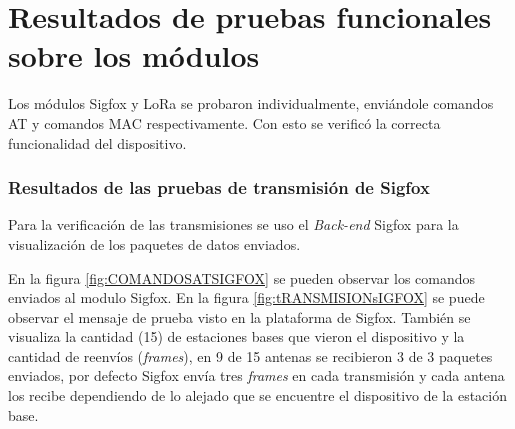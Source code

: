 \section{Resultados de pruebas funcionales sobre  los módulos}

Los módulos Sigfox y LoRa se probaron individualmente, enviándole comandos AT y comandos MAC respectivamente. Con esto se verificó la correcta funcionalidad del dispositivo.


\subsubsection{Resultados de las pruebas de transmisión de Sigfox}
Para la verificación de las transmisiones se uso el \textit{Back-end} Sigfox para la visualización de los paquetes de datos enviados.

En la figura \ref{fig:COMANDOSATSIGFOX} se pueden observar los comandos enviados al modulo Sigfox. En la figura \ref{fig:tRANSMISIONsIGFOX} se puede observar el mensaje de prueba visto en la plataforma de Sigfox. También se visualiza la cantidad (15) de estaciones bases que vieron el dispositivo y la cantidad de reenvíos (\textit{frames}), en 9 de 15 antenas se recibieron 3 de 3 paquetes enviados, por defecto Sigfox  envía tres \textit{frames} en cada transmisión y cada antena los recibe dependiendo de lo alejado que se encuentre el dispositivo de la estación base.

